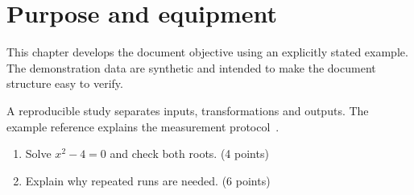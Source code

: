 \section{Purpose and equipment}


\label{sec:chapter1}
This chapter develops the document objective using an explicitly stated example. The demonstration data are synthetic and intended to make the document structure easy to verify.

A reproducible study separates inputs, transformations and outputs. The example reference explains the measurement protocol~\cite{example}.
\begin{enumerate}
\item Solve $x^2-4=0$ and check both roots. (4 points)
\item Explain why repeated runs are needed. (6 points)
\end{enumerate}
